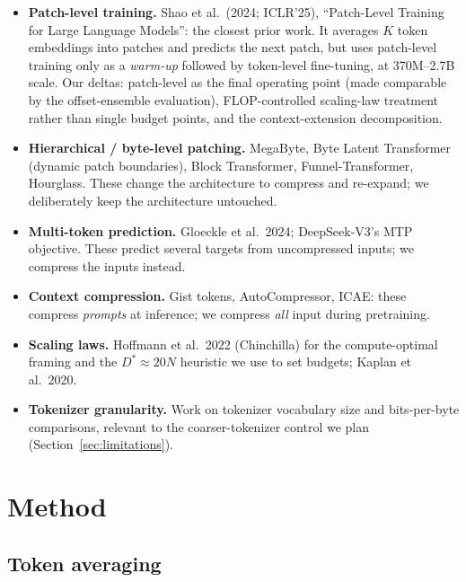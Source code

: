 \documentclass[11pt]{article}
\begin{document}
\begin{itemize}
  \item \textbf{Patch-level training.} Shao et al.\ (2024; ICLR'25),
        ``Patch-Level Training for Large Language Models'': the closest
        prior work. It averages $K$ token embeddings into patches and
        predicts the next patch, but uses patch-level training only as a
        \emph{warm-up} followed by token-level fine-tuning, at 370M--2.7B
        scale. Our deltas: patch-level as the final operating point (made
        comparable by the offset-ensemble evaluation), FLOP-controlled
        scaling-law treatment rather than single budget points, and the
        context-extension decomposition.
  \item \textbf{Hierarchical / byte-level patching.} MegaByte, Byte Latent
        Transformer (dynamic patch boundaries), Block Transformer,
        Funnel-Transformer, Hourglass. These change the architecture to
        compress and re-expand; we deliberately keep the architecture
        untouched.
  \item \textbf{Multi-token prediction.} Gloeckle et al.\ 2024; DeepSeek-V3's
        MTP objective. These predict several targets from uncompressed
        inputs; we compress the inputs instead.
  \item \textbf{Context compression.} Gist tokens, AutoCompressor, ICAE:
        these compress \emph{prompts} at inference; we compress \emph{all}
        input during pretraining.
  \item \textbf{Scaling laws.} Hoffmann et al.\ 2022 (Chinchilla) for the
        compute-optimal framing and the $D^\ast \approx 20N$ heuristic we use
        to set budgets; Kaplan et al.\ 2020.
  \item \textbf{Tokenizer granularity.} Work on tokenizer vocabulary size and
        bits-per-byte comparisons, relevant to the coarser-tokenizer
        control we plan (Section~\ref{sec:limitations}).
\end{itemize}

\section{Method}
\label{sec:method}

\subsection{Token averaging}
\label{sec:method-averaging}
\end{document}
